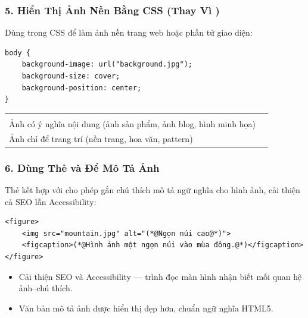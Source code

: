 \subsubsection{5. Hiển Thị Ảnh Nền Bằng CSS (Thay Vì )}

Dùng  trong CSS để làm ảnh nền trang web hoặc phần tử giao diện:

\begin{codeWindow}
\begin{lstlisting}[language=HTML5]
body {
    background-image: url("background.jpg");
    background-size: cover;
    background-position: center;
}
\end{lstlisting}
\end{codeWindow}

\begin{prettyTableBox}
\begin{tabularx}{\linewidth}{L{5cm} Z}
 &  \\
Ảnh có ý nghĩa nội dung (ảnh sản phẩm, ảnh blog, hình minh họa) &  \\
Ảnh chỉ để trang trí (nền trang, hoa văn, pattern) &  \\
\end{tabularx}
\end{prettyTableBox}

\subsubsection{6. Dùng Thẻ  và  Để Mô Tả Ảnh}

Thẻ  kết hợp với  cho phép gắn chú thích mô tả ngữ nghĩa cho hình ảnh, cải thiện cả SEO lẫn Accessibility:

\begin{codeWindow}
\begin{lstlisting}[language=HTML5]
<figure>
    <img src="mountain.jpg" alt="(*@Ngọn núi cao@*)">
    <figcaption>(*@Hình ảnh một ngọn núi vào mùa đông.@*)</figcaption>
</figure>
\end{lstlisting}
\end{codeWindow}

\begin{tipBox}
\begin{itemize}[leftmargin=1.5em, itemsep=2pt, parsep=0pt]
    \item Cải thiện SEO và Accessibility — trình đọc màn hình nhận biết mối quan hệ ảnh–chú thích.
    \item Văn bản mô tả ảnh được hiển thị đẹp hơn, chuẩn ngữ nghĩa HTML5.
\end{itemize}
\end{tipBox}

